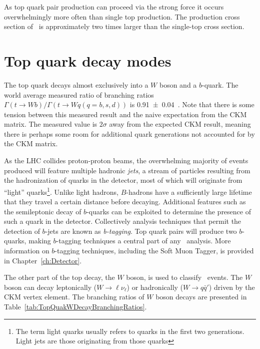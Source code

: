 As top quark pair production can proceed via the strong force it occurs overwhelmingly more often than single top production. The production cross section of \ttbar\ is approximately two times larger than the single-top cross section.

\section{Top quark decay modes}\label{sec:top_quark_decay_modes}

The top quark decays almost exclusively into a $W$ boson and a $b$-quark. The world average measured ratio of branching ratios $\Gamma(t\rightarrow Wb)/\Gamma(t\rightarrow Wq(q=b,s,d))$ is \num{0.91(4)}~\cite{Theory:PDGBooklet}. Note that there is some tension between this measured result and the naive expectation from the CKM matrix. The measured value is $2\sigma$ away from the expected CKM result, meaning there is perhaps some room for additional quark generations not accounted for by the CKM matrix.

As the LHC collides proton-proton beams, the overwhelming majority of events produced will feature multiple hadronic \textit{jets}, a stream of particles resulting from the hadronization of quarks in the detector, most of which will originate from ``light'' quarks\footnote{The term light quarks usually refers to quarks in the first two generations. Light jets are those originating from those quarks}. Unlike light hadrons, $B$-hadrons have a sufficiently large lifetime that they travel a certain distance before decaying. Additional features such as the semileptonic decay of $b$-quarks can be exploited to determine the presence of such a quark in the detector. Collectively analysis techniques that permit the detection of $b$-jets are known as \textit{b-tagging}. Top quark pairs will produce two $b$-quarks, making $b$-tagging techniques a central part of any \ttbar\ analysis. More information on $b$-tagging techniques, including the Soft Muon Tagger, is provided in Chapter~\ref{ch:Detector}.

The other part of the top decay, the $W$ boson, is used to classify \ttbar\ events. The $W$ boson can decay leptonically ($W\rightarrow\ell\nu_{\ell}$) or hadronically ($W\rightarrow q\bar{q}'$) driven by the CKM vertex element. The branching ratios of $W$ boson decays are presented in Table~\ref{tab:TopQuakWDecayBranchingRatios}.


